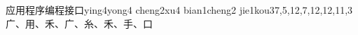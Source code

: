 \begin{EntryWithPhonetic*}{应用程序编程接口}{ying4yong4 cheng2xu4 bian1cheng2 jie1kou3}{7,5,12,7,12,12,11,3}{⼴、⽤、⽲、⼴、⽷、⽲、⼿、⼝}
\end{EntryWithPhonetic*}
